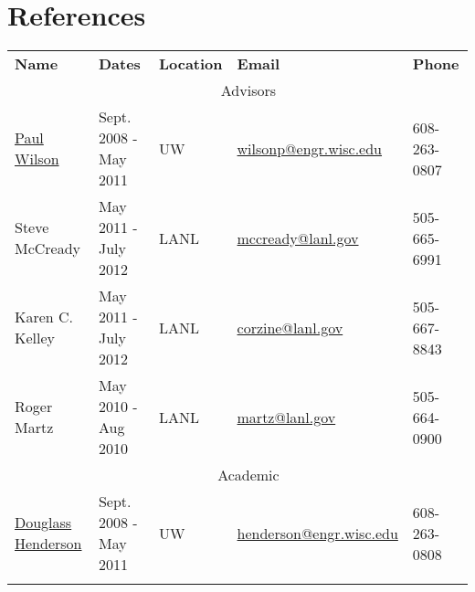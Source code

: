 %
%
%

\section{References}
\begin{longtable}{lllll} \vspace{4mm}
   \textbf{Name}    & \textbf{Dates}    & \textbf{Location}	 	& \textbf{Email} & \textbf{Phone} \\  \vspace{2mm}

              & \multicolumn{3}{c}{\Large{Advisors}} &  \\  \vspace{2mm}
{\href{https://directory.engr.wisc.edu/ep/faculty/wilson\_paul}{Paul Wilson}}\label{paul_wilson} & {Sept. 2008 - May 2011}  & {UW}& \href{mailto:wilsonp@engr.wisc.edu}{wilsonp@engr.wisc.edu} &  608-263-0807 \\ \vspace{2mm}

{Steve McCready} \label{steve_mccready}& {May 2011 - July 2012} &{LANL} & \href{mailto:mccready@lanl.gov}{mccready@lanl.gov} & 505-665-6991\\ \vspace{2mm}

{Karen C. Kelley} \label{karen_kelley} &   {May 2011 - July 2012} &{LANL} & \href{mailto:corzine@lanl.gov}{corzine@lanl.gov} & 505-667-8843\\ \vspace{2mm}


{Roger Martz}\label{roger_martz} & {May 2010 - Aug 2010} & {LANL}  & \href{mailto:martz@lanl.gov}{martz@lanl.gov} &  505-664-0900\\ \vspace{2mm}

				       

             & \multicolumn{3}{c}{\Large{Academic}} &  \\  \vspace{2mm}
{\href{https://directory.engr.wisc.edu/ep/faculty/henderson\_douglass}{Douglass Henderson}} \label{douglass_henderson}& {Sept. 2008 - May 2011}  & {UW}& \href{mailto:henderson@engr.wisc.edu}{henderson@engr.wisc.edu} &  608-263-0808 \\ \vspace{2mm}
  

\end{longtable}
